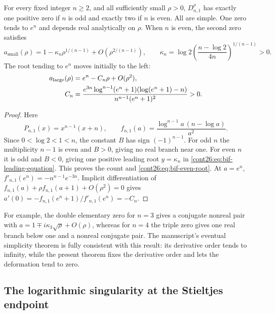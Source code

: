 \begin{corollary}
\label{cont26:cor:bif-kone}
For every fixed integer $n\geq2$, and all sufficiently small $\rho>0$,
$D_{n,1}^{\rho}$ has exactly one positive zero if $n$ is odd and
exactly two if $n$ is even. All are simple. One zero tends to $e^n$
and depends real analytically on $\rho$. When $n$ is even, the second
zero satisfies
\begin{equation}\label{cont26:eq:bif-even-root}
 a_{\mathrm{small}}(\rho)=1-\kappa_n\rho^{1/(n-1)}
             +O(\rho^{2/(n-1)}),\qquad
 \kappa_n=\log2\left(\frac{n-\log2}{4n}\right)^{1/(n-1)}>0.
\end{equation}
The root tending to $e^n$ moves initially to the left:
\begin{align}\label{cont26:eq:bif-large-root}
 a_{\mathrm{large}}(\rho)&=e^n-C_n\rho+O(\rho^2),\\
 C_n&=\frac{e^{3n}\log^{n-1}(e^n+1)
                    (\log(e^n+1)-n)}{n^{n-1}(e^n+1)^2}>0.\notag
\end{align}
\end{corollary}
\begin{proof}
Here
\[
 P_{n,1}(x)=x^{n-1}(x+n),\qquad
 f_{n,1}(a)=\frac{\log^{n-1}a\,(n-\log a)}{a^2}.
\]
Since $0<\log2<1<n$, the constant $B$ has sign $(-1)^{n-1}$.
For odd $n$ the multiplicity $n-1$ is even and $B>0$, giving no
real branch near one. For even $n$ it is odd and $B<0$, giving one
positive leading root $y=\kappa_n$ in \eqref{cont26:eq:bif-leading-equation}.
This proves the count and \eqref{cont26:eq:bif-even-root}.
At $a=e^n$,
$f'_{n,1}(e^n)=-n^{n-1}e^{-3n}$. Implicit differentiation of
$f_{n,1}(a)+\rho f_{n,1}(a+1)+O(\rho^2)=0$ gives
$a'(0)=-f_{n,1}(e^n+1)/f'_{n,1}(e^n)=-C_n$.
\end{proof}

For example, the double elementary zero for $n=3$ gives a conjugate
nonreal pair with
$a=1\mp i\kappa_3\sqrt\rho+O(\rho)$, whereas for $n=4$ the triple zero
gives one real branch below one and a nonreal conjugate pair. The
manuscript's eventual simplicity theorem is fully consistent with
this result: its derivative order tends to infinity, while the present
theorem fixes the derivative order and lets the deformation tend to zero.

\subsection{The logarithmic singularity at the Stieltjes endpoint}

